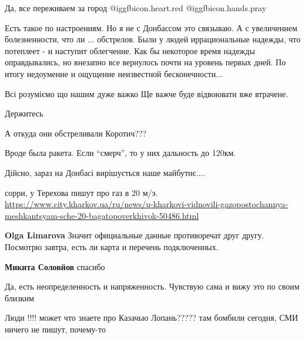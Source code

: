  
 
 
 
 
\zzSecCmt

\begin{itemize} %
Да, все переживаем за город @igg{fbicon.heart.red} ️@igg{fbicon.hands.pray} 


Есть такое по настроениям. Но я не с Донбассом это связываю. А с увеличением
болезненности, что ли ... обстрелов. Были у людей иррациональные надежды, что
потеплеет - и наступит облегчение. Как бы некоторое время надежды
оправдывались, но внезапно все вернулось почти на уровень первых дней. По итогу
недоумение и ощущение неизвестной бесконечности...

Всі розуміємо що нашим дуже важко
Ще важче буде відвоювати вже втрачене.

Держитесь

А откуда они обстреливали Коротич???

Вроде была ракета. Если \enquote{смерч}, то у них дальность до 120км.

Дійсно, зараз на Донбасі вирішується наше майбутнє....

сорри, у Терехова пишут про газ в 20 м/э.
\url{https://www.city.kharkov.ua/ru/news/u-kharkovi-vidnovili-gazopostochannya-meshkantsyam-sche-20-bagatopoverkhivok-50486.html}

\begin{itemize} %
\textbf{Olga Limarova} Значит официальные данные противоречат друг другу. Посмотрю завтра, есть ли карта и перечень подключенных.

\textbf{Микита Соловйов} спасибо
\end{itemize} %

Да, есть неопределенность и напряженность. Чувствую сама и вижу это по своим близким


Люди !!!! может что знаете про Казачью Лопань????? там бомбили сегодня,
СМИ ничего не пишут, почему-то


\end{itemize}

